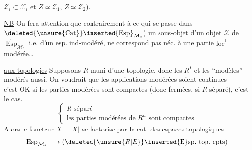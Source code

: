 $\mathcal Z_i\subset\mathcal X_i$ et $Z\simeq\mathcal Z_1$, $Z\simeq\mathcal Z_2$).

\uline{NB} On fera attention que contrairement à ce qui se passe dans $\deleted{\unsure{\operatorname{Cat}}}\inserted{\operatorname{Esp}}_{\mathcal M_*}$) un sous-objet d'un objet $\mathcal X$ de $\underrightarrow{\operatorname{Esp}}_{\mathcal M_*}$ i.e. d'un esp. ind-modéré, ne correspond pas néc. à une partie $\mathrm{loc}^{\mathrm t}$ modérée\ldots

\uline{ aux topologies} Supposons $R$ muni d'une topologie, donc les $R^I$ et les ``modèles'' modérés aussi. On voudrait que les applications modérées soient continues --- c'est OK si les parties modérées sont compactes (donc fermées, si $R$ séparé), c'est le cas.  
\[
 \left\{\begin{array}{l}R\text{ séparé}\\
 \text{les parties modérées de }R^n\text{ sont compactes}
 \end{array}\right.
\]
Alors le foncteur $X\mathbin{-}|X|$ se factorise par la cat. des espaces topologiques
\[
 \operatorname{Esp}_{\mathcal M_*}\longrightarrow(\deleted{\unsure{R|E}}\inserted{\mathrm E}\mathrm{sp.\ top.\ cpts})
\]
